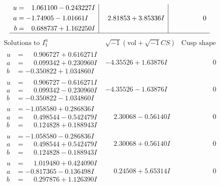 \documentclass[1p]{elsarticle_modified}
\theoremstyle{definition}
\newcommand{\I}{\sqrt{-1}}
\begin{document}
$$\begin{array}{c|c|c}
\begin{aligned}
u &= \phantom{-}1.061100 - 0.243227 I \\
a &= -1.74905 - 1.01661 I \\
b &= \phantom{-}0.688737 + 1.162250 I\end{aligned}
 & \phantom{-}2.81853 + 3.85336 I & \phantom{-0.000000 } 0\\
 \hline 
 \end{array}$$\newpage$$\begin{array}{c|c|c}  
\text{Solutions to }I^u_{1}& \I (\text{vol} + \sqrt{-1}CS) & \text{Cusp shape}\\
 \hline 
\begin{aligned}
u &= \phantom{-}0.906727 + 0.616271 I \\
a &= \phantom{-}0.099342 + 0.230960 I \\
b &= -0.350822 + 1.034860 I\end{aligned}
 & -4.35526 + 1.63876 I & \phantom{-0.000000 } 0 \\ \hline\begin{aligned}
u &= \phantom{-}0.906727 - 0.616271 I \\
a &= \phantom{-}0.099342 - 0.230960 I \\
b &= -0.350822 - 1.034860 I\end{aligned}
 & -4.35526 - 1.63876 I & \phantom{-0.000000 } 0 \\ \hline\begin{aligned}
u &= -1.058580 + 0.286836 I \\
a &= \phantom{-}0.498544 - 0.542479 I \\
b &= \phantom{-}0.124828 + 0.188943 I\end{aligned}
 & \phantom{-}2.30068 - 0.56140 I & \phantom{-0.000000 } 0 \\ \hline\begin{aligned}
u &= -1.058580 - 0.286836 I \\
a &= \phantom{-}0.498544 + 0.542479 I \\
b &= \phantom{-}0.124828 - 0.188943 I\end{aligned}
 & \phantom{-}2.30068 + 0.56140 I & \phantom{-0.000000 } 0 \\ \hline\begin{aligned}
u &= \phantom{-}1.019480 + 0.424090 I \\
a &= -0.817365 - 0.136498 I \\
b &= \phantom{-}0.297876 + 1.126390 I\end{aligned}
 & \phantom{-}0.24508 + 5.65314 I & \phantom{-0.000000 } 0 \\ \hline\begin{aligned}

\end{aligned}
\end{array}$$
\end{document}
